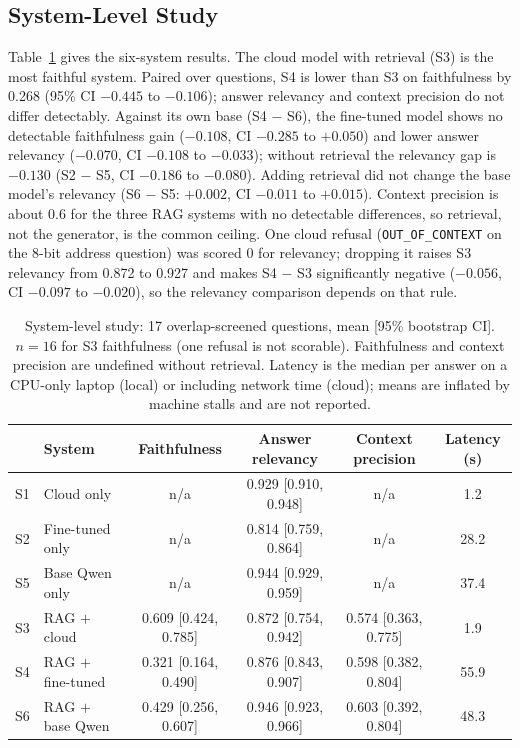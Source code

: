 \documentclass[conference]{IEEEtran}
\begin{document}
\subsection{System-Level Study}\label{sec:resA}
Table~\ref{tab:A} gives the six-system results. The cloud model with retrieval (S3) is the most faithful system. Paired over questions, S4 is lower than S3 on faithfulness by 0.268 (95\% CI $-0.445$ to $-0.106$); answer relevancy and context precision do not differ detectably. Against its own base (S4 $-$ S6), the fine-tuned model shows no detectable faithfulness gain ($-0.108$, CI $-0.285$ to $+0.050$) and lower answer relevancy ($-0.070$, CI $-0.108$ to $-0.033$); without retrieval the relevancy gap is $-0.130$ (S2 $-$ S5, CI $-0.186$ to $-0.080$). Adding retrieval did not change the base model's relevancy (S6 $-$ S5: $+0.002$, CI $-0.011$ to $+0.015$). Context precision is about 0.6 for the three RAG systems with no detectable differences, so retrieval, not the generator, is the common ceiling. One cloud refusal (\texttt{OUT\_OF\_CONTEXT} on the 8-bit address question) was scored 0 for relevancy; dropping it raises S3 relevancy from 0.872 to 0.927 and makes S4 $-$ S3 significantly negative ($-0.056$, CI $-0.097$ to $-0.020$), so the relevancy comparison depends on that rule.

\begin{table}[t]
\caption{System-level study: 17 overlap-screened questions, mean [95\% bootstrap CI]. $n=16$ for S3 faithfulness (one refusal is not scorable). Faithfulness and context precision are undefined without retrieval. Latency is the median per answer on a CPU-only laptop (local) or including network time (cloud); means are inflated by machine stalls and are not reported.}
\label{tab:A}
\centering
\begin{tabular}{llcccc}
\toprule
 & System & Faithfulness & Answer relevancy & Context precision & Latency (s) \\
\midrule
S1 & Cloud only         & n/a & 0.929 [0.910, 0.948] & n/a & 1.2 \\
S2 & Fine-tuned only    & n/a & 0.814 [0.759, 0.864] & n/a & 28.2 \\
S5 & Base Qwen only     & n/a & 0.944 [0.929, 0.959] & n/a & 37.4 \\
S3 & RAG $+$ cloud      & 0.609 [0.424, 0.785] & 0.872 [0.754, 0.942] & 0.574 [0.363, 0.775] & 1.9 \\
S4 & RAG $+$ fine-tuned & 0.321 [0.164, 0.490] & 0.876 [0.843, 0.907] & 0.598 [0.382, 0.804] & 55.9 \\
S6 & RAG $+$ base Qwen  & 0.429 [0.256, 0.607] & 0.946 [0.923, 0.966] & 0.603 [0.392, 0.804] & 48.3 \\
\bottomrule
\end{tabular}
\end{table}
\end{document}
